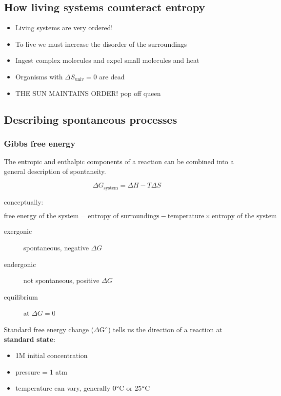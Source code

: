 \documentclass[letterpaper, 12pt]{article}
\begin{document}
\subsection*{How living systems counteract entropy}

\begin{itemize}
\item Living systems are very ordered!
\item To live we must increase the disorder of the surroundings
\item Ingest complex molecules and expel small molecules and heat
\item Organisms with $\Delta S_\text{univ} = 0$ are dead
\item THE SUN MAINTAINS ORDER! pop off queen
\end{itemize}

\subsection*{Describing spontaneous processes}

\subsubsection*{Gibbs free energy}

The entropic and enthalpic components of a reaction can be combined into a general description of spontaneity.

\begin{equation}
\Delta G_\text{system} = \Delta H - T \Delta S
\end{equation}

conceptually:

$$ \text{free energy of the system} = \text{entropy of surroundings} - \text{temperature} \times \text{entropy of the system} $$

\begin{description}
\item [exergonic] spontaneous, negative $\Delta G$
\item [endergonic] not spontaneous, positive $\Delta G$
\item [equilibrium] at $\Delta G = 0$
\end{description}

Standard free energy change ($\Delta$G$\degree$) tells us the direction of a reaction at \textbf{standard state}:

\begin{itemize}
\item 1M initial concentration
\item pressure = 1 atm
\item temperature can vary, generally 0$\degree$C or 25$\degree$C
\end{itemize}
\end{document}
